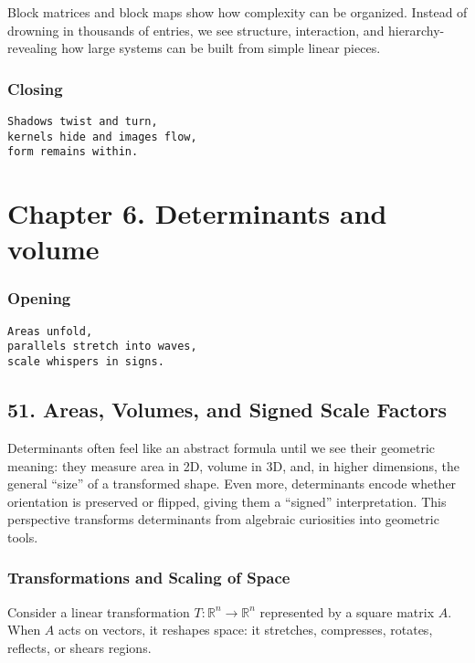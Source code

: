 \documentclass[
  letterpaper,
  DIV=11,
  numbers=noendperiod]{scrreprt}
\begin{document}
Block matrices and block maps show how complexity can be organized.
Instead of drowning in thousands of entries, we see structure,
interaction, and hierarchy-revealing how large systems can be built from
simple linear pieces.

\subsubsection{Closing}\label{closing-4}

\begin{verbatim}
Shadows twist and turn,
kernels hide and images flow,
form remains within.
\end{verbatim}

\section{Chapter 6. Determinants and
volume}\label{chapter-6.-determinants-and-volume-1}

\subsubsection{Opening}\label{opening-4}

\begin{verbatim}
Areas unfold,
parallels stretch into waves,
scale whispers in signs.
\end{verbatim}

\subsection{51. Areas, Volumes, and Signed Scale
Factors}\label{areas-volumes-and-signed-scale-factors}

Determinants often feel like an abstract formula until we see their
geometric meaning: they measure area in 2D, volume in 3D, and, in higher
dimensions, the general ``size'' of a transformed shape. Even more,
determinants encode whether orientation is preserved or flipped, giving
them a ``signed'' interpretation. This perspective transforms
determinants from algebraic curiosities into geometric tools.

\subsubsection{Transformations and Scaling of
Space}\label{transformations-and-scaling-of-space}

Consider a linear transformation \(T: \mathbb{R}^n \to \mathbb{R}^n\)
represented by a square matrix \(A\). When \(A\) acts on vectors, it
reshapes space: it stretches, compresses, rotates, reflects, or shears
regions.
\end{document}
